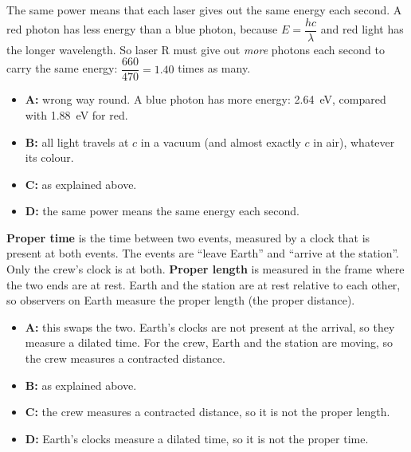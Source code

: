 \begin{practiceanswers}
\begin{practiceans}
  The same power means that each laser gives out the same energy each second. A red photon has
  less energy than a blue photon, because $E = \dfrac{hc}{\lambda}$ and red light has the longer
  wavelength. So laser R must give out \emph{more} photons each second to carry the same energy:
  $\dfrac{660}{470} = 1.40$ times as many.
  \begin{itemize}
    \item[\xmark] \textbf{A:} wrong way round. A blue photon has more energy: \qty{2.64}{eV},
      compared with \qty{1.88}{eV} for red.
    \item[\xmark] \textbf{B:} all light travels at $c$ in a vacuum (and almost exactly $c$ in
      air), whatever its colour.
    \item[\cmark] \textbf{C:} as explained above.
    \item[\xmark] \textbf{D:} the same power means the same energy each second.
  \end{itemize}
\end{practiceans}

\begin{practiceans}
  \textbf{Proper time} is the time between two events, measured by a clock that is present at
  both events. The events are ``leave Earth'' and ``arrive at the station''. Only the crew's
  clock is at both. \textbf{Proper length} is measured in the frame where the two ends are at
  rest. Earth and the station are at rest relative to each other, so observers on Earth measure
  the proper length (the proper distance).
  \begin{itemize}
    \item[\xmark] \textbf{A:} this swaps the two. Earth's clocks are not present at the arrival,
      so they measure a dilated time. For the crew, Earth and the station are moving, so the
      crew measures a contracted distance.
    \item[\cmark] \textbf{B:} as explained above.
    \item[\xmark] \textbf{C:} the crew measures a contracted distance, so it is not the proper
      length.
    \item[\xmark] \textbf{D:} Earth's clocks measure a dilated time, so it is not the proper time.
  \end{itemize}
\end{practiceans}


\end{practiceanswers}
